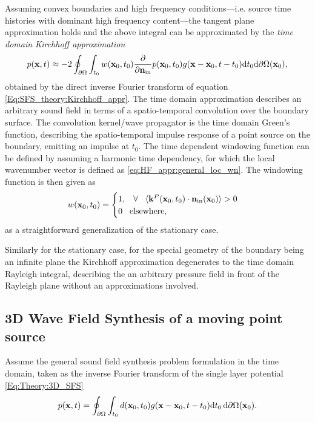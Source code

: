 Assuming convex boundaries and high frequency conditions---i.e. source time histories with dominant high frequency content---the tangent plane approximation holds and the above integral can be approximated by the \emph{time domain Kirchhoff approximation}
\begin{equation}
\label{eq:theory:KA_td}
p(\mathbf{x},t) \approx -2 \oint_{\partial \Omega} \int_{t_0} w(\mathbf{x}_0,t_0) \frac{\partial}{\partial \mathbf{n}_{\mathrm{in}}}  p(\mathbf{x}_0,t_0) g(\mathbf{x} - \mathbf{x}_0, t - t_0) \mathrm{d} t_0 \mathrm{d} \partial \Omega(\mathbf{x}_0),
\end{equation}
obtained by the direct inverse Fourier transform of equation \eqref{Eq:SFS_theory:Kirchhoff_appr}.
The time domain approximation describes an arbitrary sound field in terms of a spatio-temporal convolution over the boundary surface.
The convolution kernel/wave propagator is the time domain Green's function, describing the spatio-temporal impulse response of a point source on the boundary, emitting an impulse at $t_0$.
The time dependent windowing function can be defined by assuming a harmonic time dependency, for which the local wavenumber vector is defined as \eqref{eq:HF_appr:general_loc_wn}.
The windowing function is then given as
\begin{equation}
w(\mathbf{x}_0,t_0) = \begin{cases}
                        1, \hspace{3mm} \forall \hspace{3mm} \langle \mathbf{k}^P(\mathbf{x}_0,t_0) \cdot \mathbf{n}_{\mathrm{in}}(\mathbf{x}_0) \rangle > 0 \\
                        0  \hspace{3mm} \text{elsewhere},
                    \end{cases}
\label{eq:theory:windowing_function}
\end{equation}
as a straightforward generalization of the stationary case.

Similarly for the stationary case, for the special geometry of the boundary being an infinite plane the Kirchhoff approximation degenerates to the time domain Rayleigh integral, describing the an arbitrary pressure field in front of the Rayleigh plane without an approximations involved.

\subsection{3D Wave Field Synthesis of a moving point source}

Assume the general sound field synthesis problem formulation in the time domain, taken as the inverse Fourier transform of the single layer potential \eqref{Eq:Theory:3D_SFS}
\begin{equation}
p(\mathbf{x},t) = \oint_{\partial \Omega} \int_{t_0} d(\mathbf{x}_0,t_0) g(\mathbf{x} - \mathbf{x}_0 , t-t_0 ) \mathrm{d} t_0 \, \mathrm{d} \partial \Omega ( \mathbf{x}_0 ).
\label{eq:moving_source:SFS_problem_td}
\end{equation}

